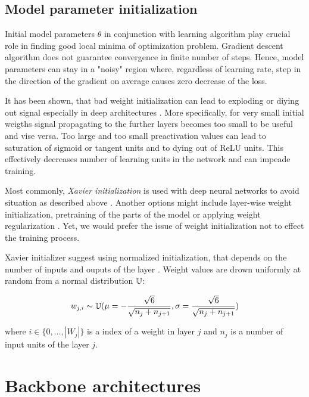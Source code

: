 \subsection{Model parameter initialization}

Initial model parameters $\theta$ in conjunction with learning algorithm play crucial role in finding good local minima of optimization problem.
Gradient descent algorithm does not guarantee convergence in finite number of steps.
Hence, model parameters can stay in a "noisy" region where, regardless of learning rate, step in the direction of the gradient on average causes zero decrease of the loss.

It has been shown, that bad weight initialization can lead to exploding or diying out signal especially in deep architectures \cite{Glorot2010}. More specifically, for very small initial weigths signal propagating to the further layers becomes too small to be useful and vise versa.
Too large and too small preactivation values can lead to saturation of sigmoid or tangent units and to dying out of ReLU units. This effectively decreases number of learning units in the network and can impeade training.

Most commonly, \textit{Xavier initialization} is used with deep neural networks to avoid situation as described above \cite{Glorot2010}.
Another options might include layer-wise weight initialization, pretraining of the parts of the model \cite{Simonyan2015} or applying weight regularization \cite{Good2016}.
Yet, we would prefer the issue of weight initialization not to effect the training process.


Xavier initializer suggest using normalized initialization, that depends on the number of inputs and ouputs of the layer \cite{Good2016}. Weight values are drown uniformly at random from a normal distribution $\Bbb{U}$:

\begin{equation}\label{eq:xavier}
  w_{j, i} \sim \Bbb{U}(
  \mu=-\frac{\sqrt{6}}{\sqrt{n_j+n_{j+1}}},
  \sigma=\frac{\sqrt{6}}{\sqrt{n_j+n_{j+1}}})
\end{equation}

where $i\in\{0, \ldots, |W_j|\}$ is a index of a weight in layer $j$ and $n_j$ is a number of input units of the layer $j$.


\section{Backbone architectures}

